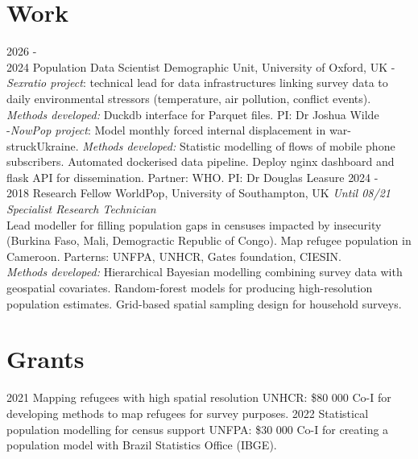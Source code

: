 \documentclass[
]{friggeri-cv}
\begin{document}
\section{Work}
\begin{entrylist}
\entry
{2026 - \\ 2024}
{Population Data Scientist}
{Demographic Unit, University of Oxford, UK}
{-\textit{Sexratio project}: technical lead for data infrastructures linking survey data to daily environmental stressors (temperature, air pollution, conflict events). \textit{Methods developed:} Duckdb interface for Parquet files. PI: Dr Joshua Wilde\\
-\textit{NowPop project}: Model monthly forced internal displacement in war-struckUkraine. \textit{Methods developed:} Statistic modelling of flows of mobile phone subscribers. Automated dockerised data pipeline. Deploy nginx dashboard and flask API for dissemination. Partner: WHO. PI: Dr Douglas Leasure}
\entry
{2024 - \\ 2018}
{Research Fellow}
{WorldPop, University of Southampton, UK}
{\textit{Until 08/21 Specialist Research Technician}\\
Lead modeller for filling population gaps in censuses impacted by insecurity (Burkina Faso, Mali, Demogractic Republic of Congo). Map  refugee population in Cameroon. Parterns: UNFPA, UNHCR, Gates foundation, CIESIN. \\
\textit{Methods developed:} Hierarchical Bayesian modelling combining survey data with geospatial covariates. Random-forest models for producing high-resolution population estimates. Grid-based spatial sampling design for household surveys.}
\end{entrylist}

\section{Grants}
\begin{entrylist}
\entry
{2021}
{Mapping refugees with high spatial resolution}
{UNHCR: \$80 000}
{Co-I for developing methods to map refugees for survey purposes.}
\entry
{2022}
{Statistical population modelling for census support}
{UNFPA: \$30 000}
{Co-I for creating a population model with Brazil Statistics Office (IBGE).}
\end{entrylist}
\end{document}
